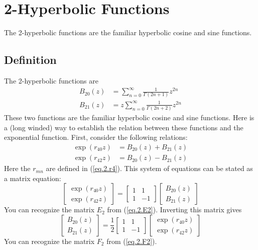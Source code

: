 \chapter{2-Hyperbolic Functions}
The 2-hyperbolic functions are the familiar hyperbolic cosine and sine functions.
\section{Definition}
The 2-hyperbolic functions are
\begin{align}
    B_{20}(z) &= \sum_{n = 0}^{\infty} \frac{1}{\Gamma\left(2n+1\right)} z^{2n} \\
    B_{21}(z) &= z \sum_{n = 0}^{\infty} \frac{1}{\Gamma\left(2n+2\right)} z^{2n}
\end{align}
These two functions are the familiar hyperbolic cosine and sine functions. Here is a (long winded) way to establish the relation between these functions and the exponential function. First, consider the following relations:
\begin{align}
    \exp\left( r_{40} z \right) &= B_{20}(z) + B_{21}(z) \\
    \exp\left( r_{42} z \right) &= B_{20}(z) - B_{21}(z)
\end{align}
Here the $r_{mn}$ are defined in (\ref{eq.2.r4}). This system of equations can be stated as a matrix equation:
\begin{equation}
    \begin{bmatrix}
        \exp\left( r_{40} z \right) \\ \exp\left( r_{42} z \right)
    \end{bmatrix} = 
    \begin{bmatrix}
        1 & 1 \\ 1 & -1
    \end{bmatrix}
    \begin{bmatrix}
        B_{20}(z) \\ B_{21}(z)
    \end{bmatrix}
\end{equation}
You can recognize the matrix $E_{2}$ from (\ref{eq.2.E2}). Inverting this matrix gives
\begin{equation}
    \begin{bmatrix}
        B_{20}(z) \\ B_{21}(z)
    \end{bmatrix} = \frac{1}{2}
    \begin{bmatrix}
        1 & 1 \\ 1 & -1
    \end{bmatrix}
    \begin{bmatrix}
        \exp\left( r_{40} z \right) \\ \exp\left( r_{42} z \right)
    \end{bmatrix}
\end{equation}
You can recognize the matrix $F_{2}$ from (\ref{eq.2.F2}).

